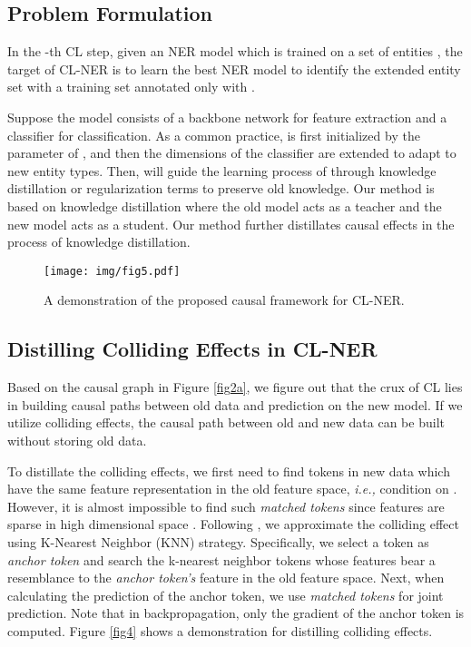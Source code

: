 \documentclass[11pt]{article}
\begin{document}
\subsection{Problem Formulation}
In the -th CL step, given an NER model  which is trained on a set of entities , the target of CL-NER is to learn the best NER model  to identify the extended entity set   with a training set annotated only with .

Suppose the model consists of a backbone network for feature extraction and a classifier for classification.
As a common practice,  is first initialized by the parameter of , and then the dimensions of the classifier are extended to adapt to new entity types.    
Then,  will guide the learning process of  through knowledge distillation \citep{monaikul2021continual} or regularization terms \citep{douillard2020podnet} to preserve old knowledge.
Our method is based on knowledge distillation where the old model  acts as a teacher and the new model  acts as a student.
Our method further distillates causal effects in the process of knowledge distillation.

\begin{figure*}[!t]
    \centering
    \texttt{[image: img/fig5.pdf]}
    \caption{A demonstration of the proposed causal framework for CL-NER.}
    \label{fig5}
\end{figure*}

\subsection{Distilling Colliding Effects in CL-NER}
Based on the causal graph in Figure \ref{fig2a}, we figure out that the crux of CL lies in building causal paths between old data and prediction on the new model.
If we utilize colliding effects, the causal path between old and new data can be built without storing old data.

To distillate the colliding effects, we first need to find tokens in new data which have the same feature representation  in the old feature space, \textit{i.e.,} condition on .
However, it is almost impossible to find such \textit{matched tokens} since features are sparse in high dimensional space \citep{altman2018curse}.
Following \citet{hu2021distilling}, we approximate the colliding effect using K-Nearest Neighbor (KNN) strategy.
Specifically, we select a token as \textit{anchor token} and search the k-nearest neighbor tokens whose features bear a resemblance to the \textit{anchor token's} feature in the old feature space.
Next, when calculating the prediction of the anchor token, we use \textit{matched tokens} for joint prediction.
Note that in backpropagation, only the gradient of the anchor token is computed.
Figure \ref{fig4} shows a demonstration for distilling colliding effects.
\end{document}
